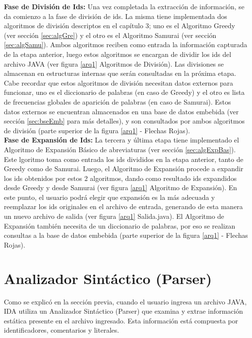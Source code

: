 \textbf{Fase de División de Ids:} Una vez completada la extracción de información, se da comienzo a la fase de división de ids. La misma tiene implementada dos algoritmos de división descriptos en el capítulo 3; uno es el Algoritmo Greedy (ver sección \ref{sec:algGre}) y el otro es el Algoritmo Samurai (ver sección \ref{sec:algSamu}). Ambos algoritmos reciben como entrada la información capturada de la etapa anterior, luego estos algoritmos se encargan de dividir los ids del archivo JAVA (ver figura \ref{arq1} Algoritmos de División). Las divisiones se almacenan en estructuras internas que serán consultadas en la próxima etapa. Cabe recordar que estos algoritmos de división necesitan datos externos para funcionar, uno es el diccionario de palabras (en caso de Greedy) y el otro es lista de frecuencias globales de aparición de palabras (en caso de Samurai). Estos datos externos se encuentran almacenados en una base de datos embebida (ver sección \ref{sec:bseEmb} para más detalles), y son consultados por ambos algoritmos de división (parte superior de la figura \ref{arq1} - Flechas Rojas).\\

\textbf{Fase de Expansión de Ids:} La tercera y última etapa tiene implementado el Algoritmo de Expansión Básico de abreviaturas (ver sección \ref{sec:algExpBas}). Este lgoritmo toma como entrada los ids divididos en la etapa anterior, tanto de Greedy como de Samurai. Luego, el Algoritmo de Expansión procede a expandir los ids obtenidos por estos 2 algoritmos, dando como resultado ids expandidos desde Greedy y desde Samurai (ver figura \ref{arq1} Algoritmo de Expansión). En este punto, el usuario podrá elegir que expansión es la más adecuada y reemplazar los ids originales en el archivo de entrada, generando de esta manera un nuevo archivo de salida (ver figura \ref{arq1} Salida.java). El \mbox{Algoritmo} de Expansión también necesita de un diccionario de palabras, por eso se realizan consultas a la base de datos embebida (parte superior de la figura \ref{arq1} - Flechas Rojas).

\section{Analizador Sintáctico (Parser)}

Como se explicó en la sección previa, cuando el usuario ingresa un archivo JAVA, IDA utiliza un Analizador Sintáctico (Parser) que examina y extrae información estática presente en el archivo ingresado. Esta información está compuesta por identificadores, comentarios y literales.

